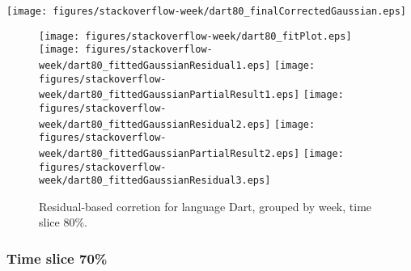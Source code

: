 \begin{center}
{\texttt{[image: figures/stackoverflow-week/dart80\_finalCorrectedGaussian.eps]}}
\end{center}

\FloatBarrier

\begin{figure}[t]
\centering
{}
{\texttt{[image: figures/stackoverflow-week/dart80\_fitPlot.eps]}}
{\texttt{[image: figures/stackoverflow-week/dart80\_fittedGaussianResidual1.eps]}}
{\texttt{[image: figures/stackoverflow-week/dart80\_fittedGaussianPartialResult1.eps]}}
{\texttt{[image: figures/stackoverflow-week/dart80\_fittedGaussianResidual2.eps]}}
{\texttt{[image: figures/stackoverflow-week/dart80\_fittedGaussianPartialResult2.eps]}}
{\texttt{[image: figures/stackoverflow-week/dart80\_fittedGaussianResidual3.eps]}}
\caption{Residual-based corretion for language Dart, grouped by week, time slice 80\%.}
\end{figure}


\FloatBarrier


\subsubsection{Time slice 70\%}


